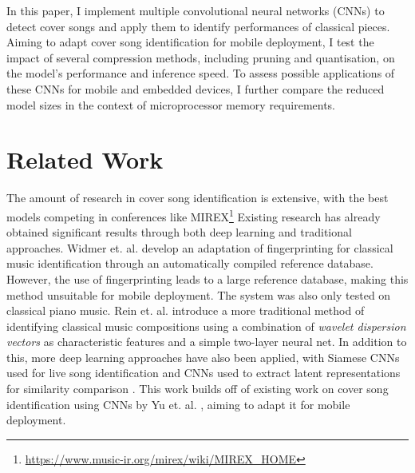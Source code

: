 \documentclass{article}
\begin{document}
In this paper, I implement multiple convolutional neural networks (CNNs) to detect cover songs and apply them to identify performances of classical pieces. Aiming to adapt cover song identification for mobile deployment, I test the impact of several compression methods, including pruning and quantisation, on the model's performance and inference speed. To assess possible applications of these CNNs for mobile and embedded devices, I further compare the reduced model sizes in the context of microprocessor memory requirements.

\section{Related Work}\label{sec:related}

The amount of research in cover song identification is extensive, with the best models competing in conferences like MIREX\footnote{\href{https://www.music-ir.org/mirex/wiki/MIREX\_HOME}{https://www.music-ir.org/mirex/wiki/MIREX\_HOME}} Existing research has already obtained significant results through both deep learning and traditional approaches. Widmer et. al. \cite{Arzt2017} develop an adaptation of fingerprinting for classical music identification through an automatically compiled reference database. However, the use of fingerprinting leads to a large reference database, making this method unsuitable for mobile deployment. The system was also only tested on classical piano music. Rein et. al. \cite{Rein2006} introduce a more traditional method of identifying classical music compositions using a combination of \textit{wavelet dispersion vectors} as characteristic features and a simple two-layer neural net. In addition to this, more deep learning approaches have also been applied, with Siamese CNNs \cite{Varior2016} used for live song identification \cite{Hakala2023} and CNNs used to extract latent representations for similarity comparison \cite{Xu2018}. This work builds off of existing work on cover song identification using CNNs by Yu et. al. \cite{Yu2020}, aiming to adapt it for mobile deployment.
\end{document}
